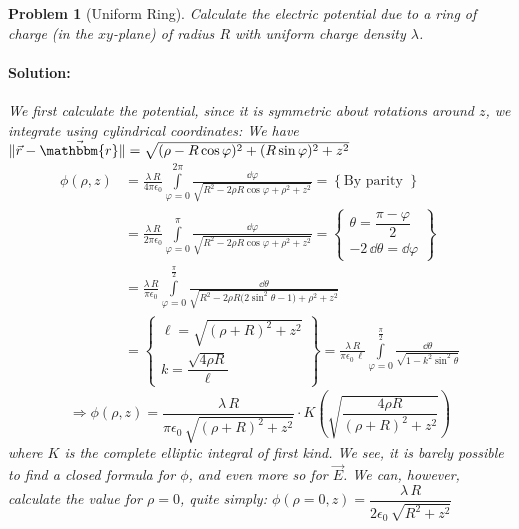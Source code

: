 \documentclass[12pt]{article}
\let\RA\Rightarrow
\newcommand*{\rv}{\vec{r}}
\newcommand*{\irv}{\vec{\mathbbm{r}}}
\newcommand*{\vE}{\vec{E}}
\newcommand*{\ee}{\epsilon_0}
\newtheorem{problem}[theorem]{Problem}
\newenvironment{solution}{\paragraph{Solution:}}{\hfill}
\begin{document}
\begin{problem}[Uniform Ring]
  Calculate the electric potential due to a ring of charge (in the $xy$-plane) of radius $R$ with uniform charge density $\lambda$.

  \begin{figure}[ht!]
    \centering
  \end{figure}
  \begin{solution}
    We first calculate the potential, since it is symmetric about rotations around $z$, we integrate using cylindrical coordinates: We have $\|\rv-\irv\|=\sqrt{(\rho-R\cos{\varphi})^2+(R\sin{\varphi})^2+z^2}$
    \begin{align*}
      \phi(\rho,z)&=\frac{\lambda\,R}{4\pi\ee}\int\limits_{\varphi=0}^{2\pi}\frac{\dd{\varphi}}{\sqrt{R^2-2\rho R\cos{\varphi}+\rho^2+z^2}}=\left\{\text{By parity }\right\}\\
      &=\frac{\lambda\,R}{2\pi\ee}\int\limits_{\varphi=0}^{\pi}\frac{\dd{\varphi}}{\sqrt{R^2-2\rho R\cos{\varphi}+\rho^2+z^2}}=\left\{\begin{array}{lr}\theta=\dfrac{\pi-\varphi}{2}\\-2\,\dd{\theta}=\dd{\varphi}\end{array}\right\}\\
      &=\frac{\lambda\,R}{\pi\ee}\int\limits_{\varphi=0}^{\frac{\pi}{2}}\frac{\dd{\theta}}{\sqrt{R^2-2\rho R\big(2\sin^2{\theta}-1\big)+\rho^2+z^2}}\\
      &=\left\{\begin{array}{lr}\ell=\sqrt{(\rho+R)^2+z^2}\\k=\dfrac{\sqrt{4\rho R}}{\ell}\end{array}\right\}=\frac{\lambda\,R}{\pi\ee\,\ell}\int\limits_{\varphi=0}^{\frac{\pi}{2}}\frac{\dd{\theta}}{\sqrt{1-k^2\sin^2{\theta}}}
    \end{align*}
    $$\RA \phi(\rho,z)=\frac{\lambda\,R}{\pi\ee\,\sqrt{(\rho+R)^2+z^2}}\cdot K\left(\sqrt{\frac{4\rho R}{(\rho+R)^2+z^2}}\right)$$
    where $K$ is the complete elliptic integral of first kind. We see, it is barely possible to find a closed formula for $\phi$, and even more so for $\vE$. We can, however, calculate the value for $\rho=0$, quite simply: $\phi(\rho=0,z)=\dfrac{\lambda\,R}{2\ee\,\sqrt{R^2+z^2}}$
  \end{solution}
\end{problem}
\end{document}

